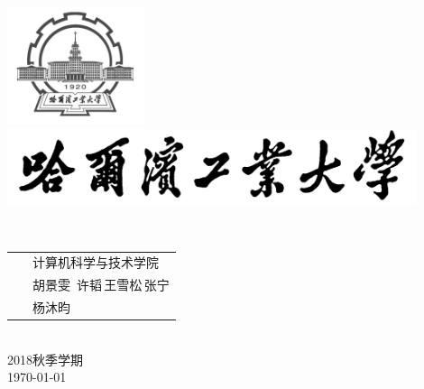 \documentclass[a4paper,12pt]{report}
\begin{document}
\begin{titlepage}
	\begin{center}
    \includegraphics[width=0.3\textwidth]{figure//sf1.png}\\
		
    \includegraphics[width=0.9\textwidth]{figure//sf.jpg}\\
    
    \vspace{10mm}

    \textbf{}\\[3cm]

	\vspace{\fill}
	
\setlength{\extrarowheight}{3mm}
{\songti{}	


\begin{tabular}{rl}
	
	{\makebox[4\ccwd][s]{学\qquad 院：}}& ~\kaishu 计算机科学与技术学院\\
	
	{\makebox[4\ccwd][s]{姓\qquad 名：}}& ~\kaishu 胡景雯 \,许韬\,王雪松\,张宁 \\

	{\makebox[4\ccwd][s]{指导老师：}} & ~\kaishu 杨沐昀\\

\end{tabular}
 }\\[2cm]

\vspace{\fill}
2018秋季学期\\
\today
	\end{center}	
\end{titlepage}
\end{document}
